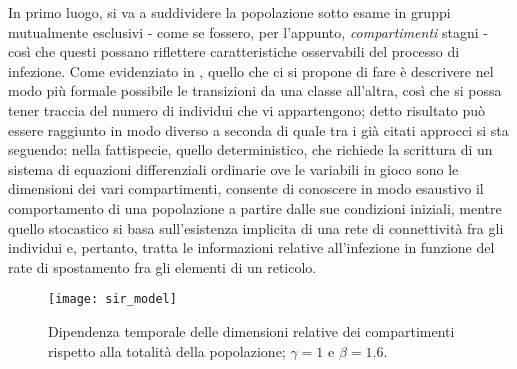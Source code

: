 In primo luogo, si va a suddividere la popolazione sotto esame in gruppi mutualmente esclusivi - come se fossero, per l'appunto, \emph{compartimenti} stagni - così che questi possano riflettere caratteristiche osservabili del processo di infezione. Come evidenziato in \cite{Kiss}, quello che ci si propone di fare è descrivere nel modo più formale possibile le transizioni da una classe all'altra, così che si possa tener traccia del numero di individui che vi appartengono; detto risultato può essere raggiunto in modo diverso a seconda di quale tra i già citati approcci si sta seguendo: 
nella fattispecie, quello deterministico, che richiede la scrittura di un sistema di equazioni differenziali ordinarie ove le variabili in gioco sono le dimensioni dei vari compartimenti, consente di conoscere in modo esaustivo il comportamento di una popolazione a partire dalle sue condizioni iniziali, mentre quello stocastico si basa sull'esistenza implicita di una rete di connettività fra gli individui e, pertanto, tratta le informazioni relative all'infezione in funzione del rate di spostamento fra gli elementi di un reticolo.
\\
\begin{figure}
		\begin{center}
			\texttt{[image: sir\_model]}
			\caption{Dipendenza temporale delle dimensioni relative dei compartimenti rispetto alla totalità della popolazione; $ \gamma = 1 $ e $ \beta = 1.6 $. \cite{Kiss}}
			\label{fig:evolution}
		\end{center}
	\end{figure}
	
